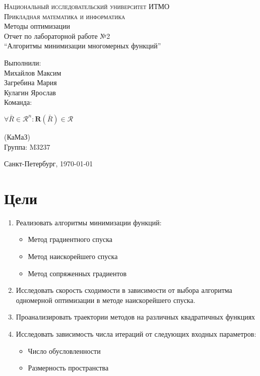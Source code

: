 


	
	\begin{titlepage}
		\begin{center}
			\textsc{Национальный исследовательский университет ИТМО\\
				Прикладная математика и информатика}\\[5cm]
			
			\huge{Методы оптимизации\\[6mm]
				\large Отчет по лабораторной работе №2\\
				``Алгоритмы минимизации многомерных функций''\\[4cm]
				
			}
		\end{center}
		
		\begin{flushright}
			\begin{minipage}{0.25\textwidth}
				Выполнили:\\[2mm]
				Михайлов Максим\\
				Загребина Мария\\
				Кулагин Ярослав\\[2mm]
				Команда:
				
				\(\forall \bar R \in \mathscr{R}^n : \mathrm{\textbf{R}}(\bar R) \in \mathscr{R}\)
				
				(КаМаЗ)\\[2mm]
				Группа: M3237
			\end{minipage}
		\end{flushright}
		
		\vfill
		\begin{center}
			Санкт-Петербург, \today
		\end{center}
	\end{titlepage}
	
	
	
	\section{Цели}
	\begin{enumerate}
		\item Реализовать алгоритмы минимизации функций:
		\begin{itemize}
			\item Метод градиентного спуска
			\item Метод наискорейшего спуска
			\item Метод сопряженных градиентов
		\end{itemize}
		\item Исследовать скорость сходимости в зависимости от выбора алгоритма одномерной оптимизации в методе наискорейшего спуска.
		\item Проанализировать траектории методов на различных квадратичных функциях
		\item Исследовать зависимость числа итераций от следующих входных параметров:
		\begin{itemize}
			\item Число обусловленности
			\item Размерность пространства
		\end{itemize}
	\end{enumerate}
	

